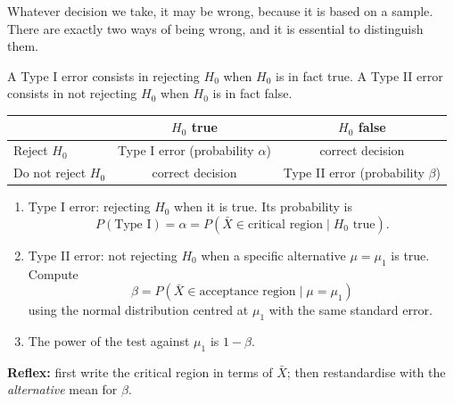 \documentclass[11pt]{article}
\newcommand{\cle}[1]{{\popxbold\color{popdark}#1}}
\begin{document}
Whatever decision we take, it may be wrong, because it is based on a sample. There are exactly two ways of being wrong, and it is essential to distinguish them.

\begin{definition}
A \cle{Type I error} consists in rejecting $H_0$ when $H_0$ is in fact true. A \cle{Type II error} consists in not rejecting $H_0$ when $H_0$ is in fact false.
\end{definition}

\begin{center}
\begin{tabular}{|l|c|c|}
\hline
\rowcolor{popblueL} & $H_0$ true & $H_0$ false \\
\hline
Reject $H_0$ & Type I error (probability $\alpha$) & correct decision \\
\hline
Do not reject $H_0$ & correct decision & Type II error (probability $\beta$) \\
\hline
\end{tabular}
\end{center}

\begin{methode}
\begin{enumerate}
\item \cle{Type I error}: rejecting $H_0$ when it is true. Its probability is
\[ P(\text{Type I})=\alpha=P(\bar{X}\in\text{critical region}\mid H_0\text{ true}). \]
\item \cle{Type II error}: not rejecting $H_0$ when a specific alternative $\mu=\mu_1$ is true. Compute
\[ \beta=P(\bar{X}\in\text{acceptance region}\mid \mu=\mu_1) \]
using the normal distribution centred at $\mu_1$ with the same standard error.
\item The \cle{power} of the test against $\mu_1$ is $1-\beta$.
\end{enumerate}
\textbf{Reflex:} first write the critical region in terms of $\bar{X}$; then restandardise with the \emph{alternative} mean for $\beta$.
\end{methode}
\end{document}
